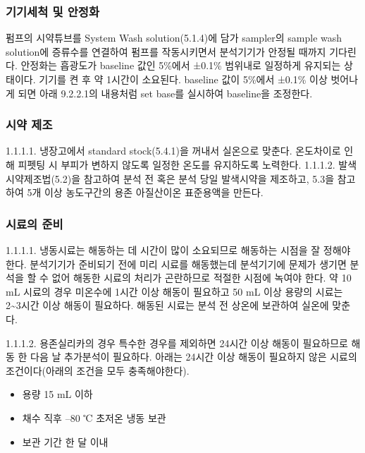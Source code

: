\documentclass[
]{book}
\providecommand{\tightlist}{%
  \setlength{\itemsep}{0pt}\setlength{\parskip}{0pt}}
\begin{document}
\hypertarget{uxae30uxae30uxc138uxcc99-uxbc0f-uxc548uxc815uxd654}{%
\subsubsection{기기세척 및 안정화}\label{uxae30uxae30uxc138uxcc99-uxbc0f-uxc548uxc815uxd654}}

펌프의 시약튜브를 System Wash solution(5.1.4)에 담가 sampler의 sample wash solution에 증류수를 연결하여 펌프를 작동시키면서 분석기기가 안정될 때까지 기다린다. 안정화는 흡광도가 baseline 값인 5\%에서 ±0.1\% 범위내로 일정하게 유지되는 상태이다. 기기를 켠 후 약 1시간이 소요된다. baseline 값이 5\%에서 ±0.1\% 이상 벗어나게 되면 아래 9.2.2.1의 내용처럼 set base를 실시하여 baseline을 조정한다.

\hypertarget{uxc2dcuxc57d-uxc81cuxc870}{%
\subsubsection{시약 제조}\label{uxc2dcuxc57d-uxc81cuxc870}}

1.1.1.1. 냉장고에서 standard stock(5.4.1)을 꺼내서 실온으로 맞춘다. 온도차이로 인해 피펫팅 시 부피가 변하지 않도록 일정한 온도를 유지하도록 노력한다.
1.1.1.2. 발색 시약제조법(5.2)을 참고하여 분석 전 혹은 분석 당일 발색시약을 제조하고, 5.3을 참고하여 5개 이상 농도구간의 용존 아질산이온 표준용액을 만든다.

\hypertarget{uxc2dcuxb8ccuxc758-uxc900uxbe44}{%
\subsubsection{시료의 준비}\label{uxc2dcuxb8ccuxc758-uxc900uxbe44}}

1.1.1.1. 냉동시료는 해동하는 데 시간이 많이 소요되므로 해동하는 시점을 잘 정해야 한다. 분석기기가 준비되기 전에 미리 시료를 해동했는데 분석기기에 문제가 생기면 분석을 할 수 없어 해동한 시료의 처리가 곤란하므로 적절한 시점에 녹여야 한다. 약 10 mL 시료의 경우 미온수에 1시간 이상 해동이 필요하고 50 mL 이상 용량의 시료는 2\textasciitilde3시간 이상 해동이 필요하다. 해동된 시료는 분석 전 상온에 보관하여 실온에 맞춘다.

1.1.1.2. 용존실리카의 경우 특수한 경우를 제외하면 24시간 이상 해동이 필요하므로 해동 한 다음 날 추가분석이 필요하다. 아래는 24시간 이상 해동이 필요하지 않은 시료의 조건이다(아래의 조건을 모두 충족해야한다).

\begin{itemize}
\tightlist
\item
  용량 15 mL 이하
\item
  채수 직후 --80 ℃ 초저온 냉동 보관
\item
  보관 기간 한 달 이내
\end{itemize}
\end{document}
